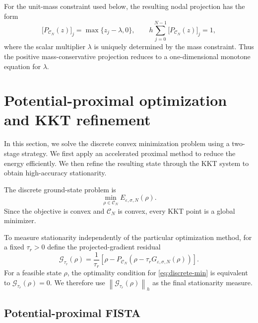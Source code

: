 \documentclass[11pt]{article}
\newcommand{\CN}{\mathcal{C}_N}
\newcommand{\eps}{\varepsilon}
\newcommand{\sig}{\sigma}
\newcommand{\norm}[1]{\left\|#1\right\|}
\theoremstyle{plain}
\theoremstyle{definition}
\numberwithin{equation}{section}
\begin{document}
For the unit-mass constraint used below, the resulting nodal
projection has the form
\begin{equation}
\label{eq:simplex-form}
\bigl[P_{\CN}(z)\bigr]_j
=
\max\{z_j-\lambda,0\},
\qquad
h\sum_{j=0}^{N-1}
\bigl[P_{\CN}(z)\bigr]_j
=
1,
\end{equation}
where the scalar multiplier $\lambda$ is uniquely determined by the
mass constraint. Thus the positive mass-conservative projection
reduces to a one-dimensional monotone equation for $\lambda$.



\section{Potential-proximal optimization and KKT refinement}
\label{sec:opt}

In this section, we solve the discrete convex minimization problem
using a two-stage strategy. We first apply an accelerated proximal
method to reduce the energy efficiently. We then refine the resulting
state through the KKT system to obtain high-accuracy stationarity.

The discrete ground-state problem is
\begin{equation}
\label{eq:discrete-min}
\min_{\rho\in\CN}E_{\eps,\sig,N}(\rho).
\end{equation}
Since the objective is convex and $\CN$ is convex, every KKT point is
a global minimizer.

To measure stationarity independently of the particular optimization
method, for a fixed $\tau_r>0$ define the projected-gradient residual
\begin{equation}
\label{eq:pg-map}
\mathcal G_{\tau_r}(\rho)
=
\frac{1}{\tau_r}
\left[
\rho
-
P_{\CN}
\left(
\rho-\tau_rG_{\eps,\sig,N}(\rho)
\right)
\right].
\end{equation}
For a feasible state $\rho$, the optimality condition for
\eqref{eq:discrete-min} is equivalent to
$\mathcal G_{\tau_r}(\rho)=0$. We therefore use
$\norm{\mathcal G_{\tau_r}(\rho)}_h$ as the final stationarity
measure.


\subsection{Potential-proximal FISTA} 
\label{subsec:potential_FISTA}
\end{document}
